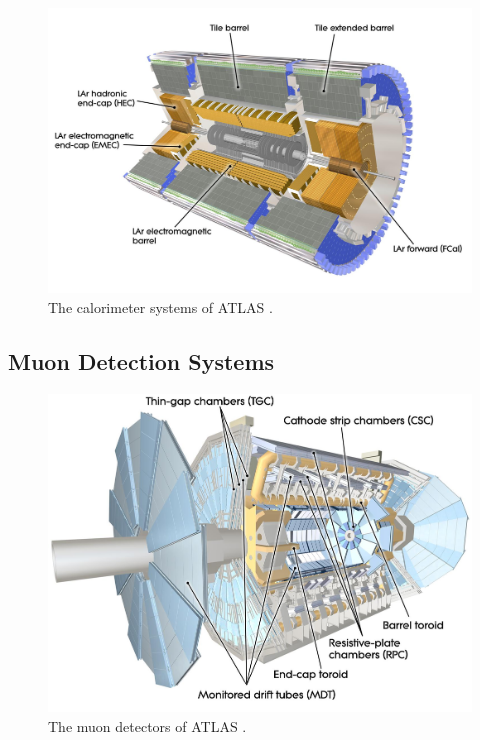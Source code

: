 \begin{figure}[!h]
  \centering
  \includegraphics[width=\textwidth]{Images/ATLAS/ATLASCalo.jpg}
  \caption{The calorimeter systems of ATLAS \cite{ATLASschematics}.}
  \label{fig-AtlasDecCalo}
\end{figure}

\subsection{Muon Detection Systems}
\begin{figure}[!h]
  \centering
  \includegraphics[width=\textwidth]{Images/ATLAS/ATLASMuon.jpg}
  \caption{The muon detectors of ATLAS \cite{ATLASschematics}.}
  \label{fig-AtlasDecMuon}
\end{figure}
